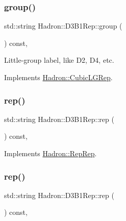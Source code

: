 \subsubsection{\texorpdfstring{group()}{group()}\hspace{0.1cm}{\footnotesize\ttfamily [3/3]}}
{\footnotesize\ttfamily std\+::string Hadron\+::\+D3\+B1\+Rep\+::group (\begin{DoxyParamCaption}{ }\end{DoxyParamCaption}) const\hspace{0.3cm}{\ttfamily [inline]}, {\ttfamily [virtual]}}

Little-\/group label, like D2, D4, etc. 

Implements \mbox{\hyperlink{structHadron_1_1CubicLGRep_a9bdb14b519a611d21379ed96a3a9eb41}{Hadron\+::\+Cubic\+L\+G\+Rep}}.

\mbox{\label{structHadron_1_1D3B1Rep_a12a506574bb30503f11952150a0a7d6f}} 
\subsubsection{\texorpdfstring{rep()}{rep()}\hspace{0.1cm}{\footnotesize\ttfamily [1/3]}}
{\footnotesize\ttfamily std\+::string Hadron\+::\+D3\+B1\+Rep\+::rep (\begin{DoxyParamCaption}{ }\end{DoxyParamCaption}) const\hspace{0.3cm}{\ttfamily [inline]}, {\ttfamily [virtual]}}



Implements \mbox{\hyperlink{structHadron_1_1RepRep_ab3213025f6de249f7095892109575fde}{Hadron\+::\+Rep\+Rep}}.

\mbox{\label{structHadron_1_1D3B1Rep_a12a506574bb30503f11952150a0a7d6f}} 
\subsubsection{\texorpdfstring{rep()}{rep()}\hspace{0.1cm}{\footnotesize\ttfamily [2/3]}}
{\footnotesize\ttfamily std\+::string Hadron\+::\+D3\+B1\+Rep\+::rep (\begin{DoxyParamCaption}{ }\end{DoxyParamCaption}) const\hspace{0.3cm}{\ttfamily [inline]}, {\ttfamily [virtual]}}



